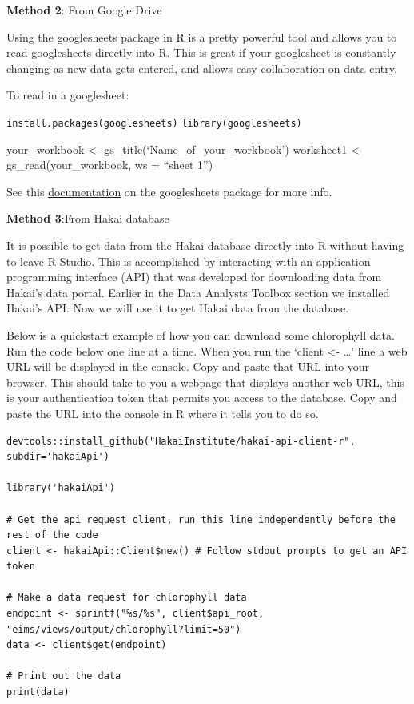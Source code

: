 \documentclass[]{book}
\begin{document}
\textbf{Method 2}: From Google Drive

Using the googlesheets package in R is a pretty powerful tool and allows
you to read googlesheets directly into R. This is great if your
googlesheet is constantly changing as new data gets entered, and allows
easy collaboration on data entry.

To read in a googlesheet:

\texttt{install.packages(\textquotesingle{}googlesheets\textquotesingle{})}
\texttt{library(googlesheets)}

your\_workbook \textless{}- gs\_title(`Name\_of\_your\_workbook')
worksheet1 \textless{}- gs\_read(your\_workbook, ws = ``sheet 1'')

See this
\href{https://cran.r-project.org/web/packages/googlesheets/vignettes/basic-usage.html}{documentation}
on the googlesheets package for more info.

\textbf{Method 3}:From Hakai database

It is possible to get data from the Hakai database directly into R
without having to leave R Studio. This is accomplished by interacting
with an application programming interface (API) that was developed for
downloading data from Hakai's data portal. Earlier in the Data Analysts
Toolbox section we installed Hakai's API. Now we will use it to get
Hakai data from the database.

Below is a quickstart example of how you can download some chlorophyll
data. Run the code below one line at a time. When you run the `client
\textless{}- \ldots{}' line a web URL will be displayed in the console.
Copy and paste that URL into your browser. This should take to you a
webpage that displays another web URL, this is your authentication token
that permits you access to the database. Copy and paste the URL into the
console in R where it tells you to do so.

\begin{verbatim}
devtools::install_github("HakaiInstitute/hakai-api-client-r", subdir='hakaiApi')

library('hakaiApi')

# Get the api request client, run this line independently before the rest of the code
client <- hakaiApi::Client$new() # Follow stdout prompts to get an API token

# Make a data request for chlorophyll data
endpoint <- sprintf("%s/%s", client$api_root, "eims/views/output/chlorophyll?limit=50")
data <- client$get(endpoint)

# Print out the data
print(data)
\end{verbatim}
\end{document}
